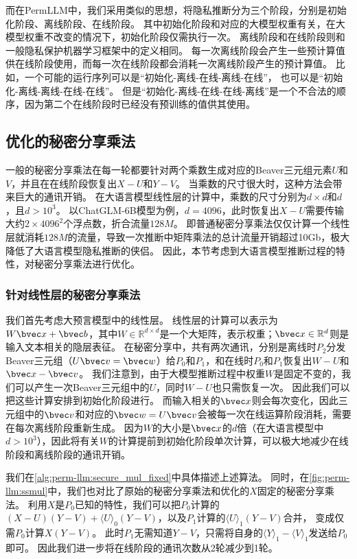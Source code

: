 %
而在PermLLM中，我们采用类似的思想，将隐私推断分为三个阶段，分别是初始化阶段、离线阶段、在线阶段。
%
其中初始化阶段和对应的大模型权重有关，在大模型权重不改变的情况下，初始化阶段仅需执行一次。
%
离线阶段和在线阶段则和一般隐私保护机器学习框架中的定义相同。
每一次离线阶段会产生一些预计算值供在线阶段使用，而每一次在线阶段都会消耗一次离线阶段产生的预计算值。
%
比如，一个可能的运行序列可以是“初始化-离线-在线-离线-在线”，
也可以是“初始化-离线-离线-在线-在线”。
但是“初始化-离线-在线-在线-离线”是一个不合法的顺序，因为第二个在线阶段时已经没有预训练的值供其使用。

\subsection{优化的秘密分享乘法}
一般的秘密分享乘法在每一轮都要针对两个乘数生成对应的Beaver三元组元素$U$和$V$，并且在在线阶段恢复出$X - U$和$Y- V$。
当乘数的尺寸很大时，这种方法会带来巨大的通讯开销。
%
在大语言模型线性层的计算中，乘数的尺寸分别为$d\times d$和$d$，且$d > 10^3$。
以ChatGLM-6B模型为例，$d = 4096$，此时恢复出$X - U$需要传输大约$2\times 4096^2$个浮点数，折合流量$128M$。
%
即普通秘密分享乘法仅仅计算一个线性层就消耗$128M$的流量，导致一次推断中矩阵乘法的总计流量开销超过10Gb，极大降低了大语言模型隐私推断的侠侣。
%
因此，本节考虑到大语言模型推断过程的特性，对秘密分享乘法进行优化。

%

\subsubsection{针对线性层的秘密分享乘法}
我们首先考虑大预言模型中的线性层。
%
线性层的计算可以表示为$W \bvec x + \bvec b$，其中$W \in \mathbb R^{d\times d}$是一个大矩阵，表示权重；$\bvec x \in \mathbb R^{d}$则是输入文本相关的隐层表征。
%
在秘密分享中，共有两次通讯，分别是离线时$P_2$分发Beaver三元组（$U\bvec v = \bvec w$）给$P_0$和$P_1$，和在线时$P_0$和$P_1$恢复出$W - U$和$\bvec x - \bvec v$。
%
我们注意到，由于大模型推断过程中权重$W$是固定不变的，我们可以产生一次Beaver三元组中的$U$，同时$W - U$也只需恢复一次。
因此我们可以把这些计算安排到初始化阶段进行。
%
而输入相关的$\bvec x$则会每次变化，因此三元组中的$\bvec v$和对应的$\bvec w=U\bvec v$会被每一次在线运算阶段消耗，需要在每次离线阶段重新生成。
%
因为$W$的大小是$\bvec x$的$d$倍（在大语言模型中$d > 10^3$），因此将有关$W$的计算提前到初始化阶段单次计算，可以极大地减少在线阶段和离线阶段的通讯开销。


我们在\autoref{alg:perm-llm:secure_mul_fixed}中具体描述上述算法。
同时，在\autoref{fig:perm-llm:ssmul}中，我们也对比了原始的秘密分享乘法和优化的$X$固定的秘密分享乘法。
%
利用$X$是$P_0$已知的特性，我们可以把$P_0$计算的$(X-U)(Y-V) + \langle U \rangle_0(Y-V)$，以及$P_1$计算的$\langle U \rangle_1(Y-V)$合并，
变成仅需$P_0$计算$X(Y-V)$。
%
此时$P_1$无需知道$Y-V$，只需将自身的$\langle Y \rangle_1 - \langle V \rangle_1$发送给$P_0$即可。
因此我们进一步将在线阶段的通讯次数从2轮减少到1轮。
%


